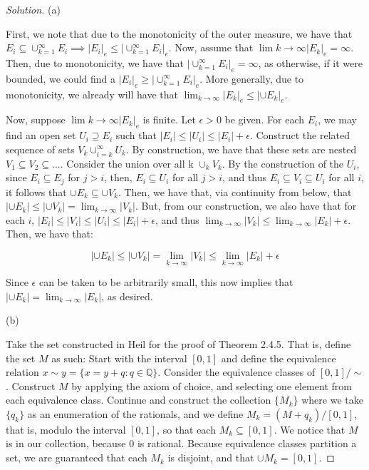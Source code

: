 \documentclass[10pt]{article}
\begin{document}
\begin{proof}[Solution]
(a)

First, we note that due to the monotonicity of the outer measure, we have that $E_i \subseteq \cup_{k=1}^\infty E_i \implies | E_i |_e \leq |\cup_{k=1}^\infty E_i|_e$. Now, assume that $\lim{k \to \infty} |E_k|_e = \infty$. Then, due to monotonicity, we have that $ |\cup_{k=1}^\infty E_i|_e = \infty$, as otherwise, if it were bounded, we could find a $|E_i|_e \geq |\cup_{k=1}^\infty E_i|_e$. More generally, due to monotonicity, we already will have that  $\lim_{k \to \infty} |E_k|_e \leq |\cup E_k|_e$.

Now, suppose $\lim{k \to \infty} |E_k|_e$ is finite. Let $\epsilon > 0$ be given. For each $E_i$, we may find an open set $U_i \supseteq E_i$ such that $|E_i| \leq |U_i| \leq |E_i| + \epsilon$. Construct the related sequence of sets $V_k \cup_{i=k}^\infty U_k$. By construction, we have that these sets are nested $V_1 \subseteq V_2 \subseteq ...$. Consider the union over all k $\cup_k V_k$. By the construction of the $U_i$, since $E_i \subseteq E_j$ for $j > i$, then, $E_i \subseteq U_i$ for all $j > i$, and thus $E_i \subseteq V_i \subseteq U_i$ for all $i$, it follows that $\cup E_k \subseteq \cup V_k$. Then, we have that, via continuity from below, that $|\cup E_k| \leq |\cup V_k| = \lim_{k \to \infty} |V_k|$. But, from our construction, we also have that for each $i$, $|E_i| \leq |V_i| \leq |U_i| \leq |E_i| + \epsilon$, and thus $\lim_{k \to \infty} |V_k| \leq \lim_{k \to \infty} |E_k| + \epsilon$. Then, we have that:

 $$|\cup E_k| \leq |\cup V_k| = \lim_{k \to \infty} |V_k| \leq \lim_{k \to \infty} |E_k| + \epsilon$$

Since $\epsilon$ can be taken to be arbitrarily small, this now implies that $|\cup E_k| = \lim_{k \to \infty} |E_k|$, as desired.

(b)

Take the set constructed in Heil for the proof of Theorem 2.4.5. That is, define the set $M$ as such: Start with the interval $[0,1]$ and define the equivalence relation $x \sim y = \{  x = y + q : q \in \mathbb{Q} \}$. Consider the equivalence classes of $[0,1]/\sim$. Construct $M$ by applying the axiom of choice, and selecting one element from each equivalence class. Continue and construct the collection $\{ M_k \}$ where we take $\{ q_k \}$ as an enumeration of the rationals, and we define $ M_k = (M + q_k)/[0,1]$, that is, modulo the interval $[0,1]$, so that each $M_k \subseteq [0,1]$. We notice that $M$ is in our collection, because $0$ is rational. Because equivalence classes partition a set, we are guaranteed that each $M_k$ is disjoint, and that $\cup M_k = [0,1]$.


\end{proof}
\end{document}
